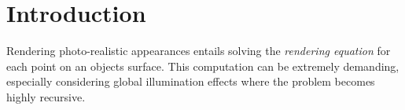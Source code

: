 \section{Introduction}
Rendering photo-realistic appearances entails solving the \textit{rendering equation} for each point on an objects surface. This computation can be extremely demanding, especially considering global illumination effects where the problem becomes highly recursive. \\
